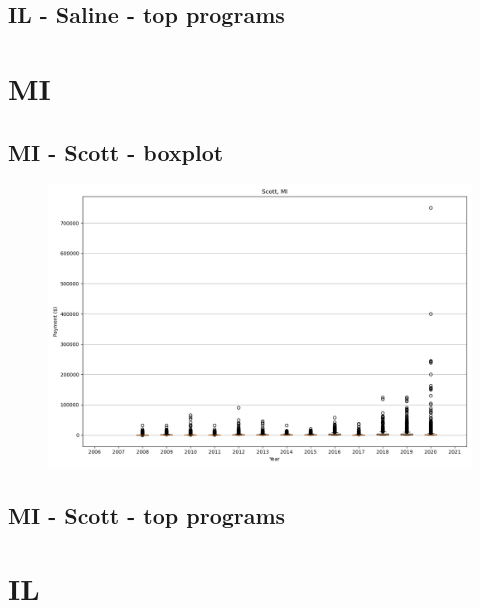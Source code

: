 \subsection*{IL - Saline - top programs}

\newpage
\section*{MI}
\subsection*{MI - Scott - boxplot}
\begin{figure}[h]
\centering
\includegraphics[width=7in]{../output/boxplots/counties/Scott-MI_boxplot.png}
\end{figure}


\subsection*{MI - Scott - top programs}

\newpage
\section*{IL}
